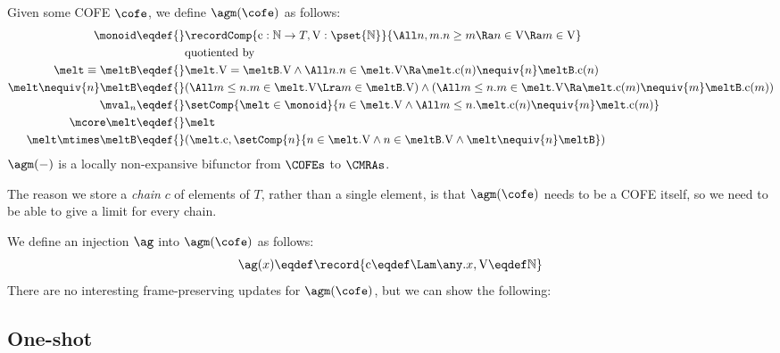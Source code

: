 Given some COFE $\cofe$, we define $\agm(\cofe)$ as follows:
\newcommand{\agc}{\mathrm{c}} %
\newcommand{\agV}{\mathrm{V}} %
\begin{align*}
  \monoid \eqdef{}& \recordComp{\agc : \mathbb{N} \to T , \agV : \pset{\mathbb{N}}}{ \All n, m. n \geq m \Ra n \in \agV \Ra m \in \agV  } \\
  & \text{quotiented by} \\
  \melt \equiv \meltB \eqdef{}& \melt.\agV = \meltB.\agV \land \All n. n \in \melt.\agV \Ra \melt.\agc(n) \nequiv{n} \meltB.\agc(n) \\
  \melt \nequiv{n} \meltB \eqdef{}& (\All m \leq n. m \in \melt.\agV \Lra m \in \meltB.\agV) \land (\All m \leq n. m \in \melt.\agV \Ra \melt.\agc(m) \nequiv{m} \meltB.\agc(m)) \\
  \mval_n \eqdef{}& \setComp{\melt \in \monoid}{ n \in \melt.\agV \land \All m \leq n. \melt.\agc(n) \nequiv{m} \melt.\agc(m) } \\
  \mcore\melt \eqdef{}& \melt \\
  \melt \mtimes \meltB \eqdef{}& (\melt.\agc, \setComp{n}{n \in \melt.\agV \land n \in \meltB.\agV \land \melt \nequiv{n} \meltB })
\end{align*}
$\agm(-)$ is a locally non-expansive bifunctor from $\COFEs$ to $\CMRAs$.

The reason we store a \emph{chain} $c$ of elements of $T$, rather than a single element, is that $\agm(\cofe)$ needs to be a COFE itself, so we need to be able to give a limit for every chain.

We define an injection $\ag$ into $\agm(\cofe)$ as follows:
\[ \ag(x) \eqdef \record{\mathrm c \eqdef \Lam \any. x, \mathrm V \eqdef \mathbb{N}} \]
There are no interesting frame-preserving updates for $\agm(\cofe)$, but we can show the following:
\begin{mathpar}

  
\end{mathpar}

\subsection{One-shot}

